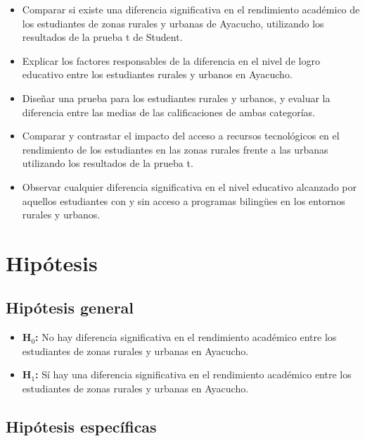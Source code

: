 \documentclass[
]{article}
\begin{document}
\begin{itemize}
    \item Comparar si existe una diferencia significativa en el rendimiento académico de los estudiantes de zonas rurales y urbanas de Ayacucho, utilizando los resultados de la prueba t de Student.
    \item Explicar los factores responsables de la diferencia en el nivel de logro educativo entre los estudiantes rurales y urbanos en Ayacucho.
    \item Diseñar una prueba para los estudiantes rurales y urbanos, y evaluar la diferencia entre las medias de las calificaciones de ambas categorías.
    \item Comparar y contrastar el impacto del acceso a recursos tecnológicos en el rendimiento de los estudiantes en las zonas rurales frente a las urbanas utilizando los resultados de la prueba t.
    \item Observar cualquier diferencia significativa en el nivel educativo alcanzado por aquellos estudiantes con y sin acceso a programas bilingües en los entornos rurales y urbanos.
\end{itemize}

\section*{Hipótesis}\label{hipuxf3tesis}

\subsection*{Hipótesis general}\label{hipuxf3tesis-general}

\begin{itemize}
    \item \textbf{H$_{0}$:} No hay diferencia significativa en el rendimiento académico entre los estudiantes de zonas rurales y urbanas en Ayacucho.

  \item \textbf{H$_{1}$:} Sí hay una diferencia significativa en el rendimiento académico entre los estudiantes de zonas rurales y urbanas en Ayacucho.

\end{itemize}

\subsection*{Hipótesis específicas}\label{hipuxf3tesis-especuxedficas}
\end{document}
